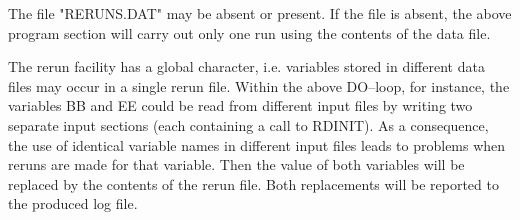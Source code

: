\documentclass[11pt]{article}
\begin{document}
The file "RERUNS.DAT" may be absent or present. If the file is absent, the above
program section will carry out only one run using the contents of the data file.

The rerun facility has a global character, i.e. variables stored in different data files may
occur in a single rerun file. Within the above DO--{}loop, for instance, the variables BB
and EE could be read from different input files by writing two separate input sections
(each containing a call to RDINIT). As a consequence, the use of identical variable names
in different input files leads to problems when reruns are made for that variable. Then the
value of both  variables will be replaced by the contents of the rerun file. Both replace\-ments will be reported to the produced log file.
\end{document}
